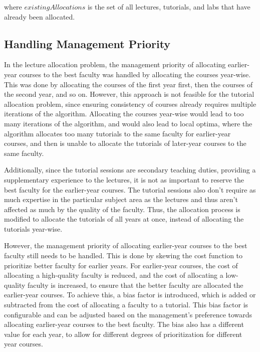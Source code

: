 where $existingAllocations$ is the set of all lectures, tutorials, and labs that have already been allocated.

\subsection{Handling Management Priority}

In the lecture allocation problem, the management priority of allocating earlier-year courses to the best faculty was handled by allocating the courses year-wise. This was done by allocating the courses of the first year first, then the courses of the second year, and so on. However, this approach is not feasible for the tutorial allocation problem, since ensuring consistency of courses already requires multiple iterations of the algorithm. Allocating the courses year-wise would lead to too many iterations of the algorithm, and would also lead to local optima, where the algorithm allocates too many tutorials to the same faculty for earlier-year courses, and then is unable to allocate the tutorials of later-year courses to the same faculty.

Additionally, since the tutorial sessions are secondary teaching duties, providing a supplementary experience to the lectures, it is not as important to reserve the best faculty for the earlier-year courses. The tutorial sessions also don't require as much expertise in the particular subject area as the lectures and thus aren't affected as much by the quality of the faculty. Thus, the allocation process is modified to allocate the tutorials of all years at once, instead of allocating the tutorials year-wise.

However, the management priority of allocating earlier-year courses to the best faculty still needs to be handled. This is done by skewing the cost function to prioritize better faculty for earlier years. For earlier-year courses, the cost of allocating a high-quality faculty is reduced, and the cost of allocating a low-quality faculty is increased, to ensure that the better faculty are allocated the earlier-year courses. To achieve this, a bias factor is introduced, which is added or subtracted from the cost of allocating a faculty to a tutorial. This bias factor is configurable and can be adjusted based on the management's preference towards allocating earlier-year courses to the best faculty. The bias also has a different value for each year, to allow for different degrees of prioritization for different year courses.

